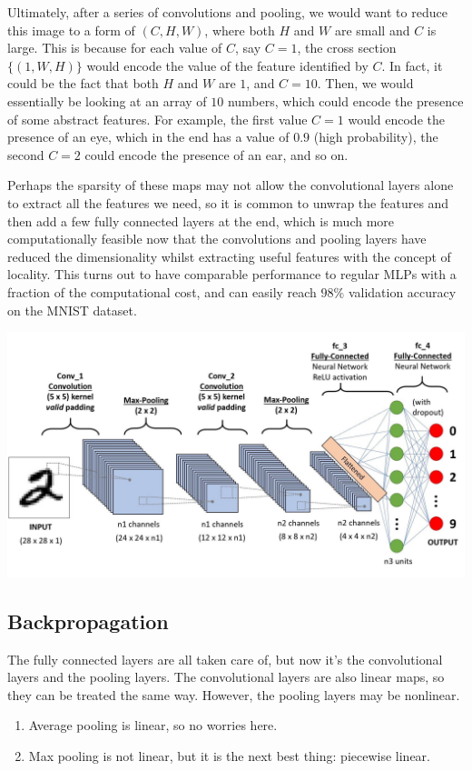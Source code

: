   Ultimately, after a series of convolutions and pooling, we would want to reduce this image to a form of $(C, H, W)$, where both $H$ and $W$ are small and $C$ is large. This is because for each value of $C$, say $C = 1$, the cross section $\{(1, W, H)\}$ would encode the value of the feature identified by $C$. In fact, it could be the fact that both $H$ and $W$ are $1$, and $C = 10$. Then, we would essentially be looking at an array of $10$ numbers, which could encode the presence of some abstract features. For example, the first value $C = 1$ would encode the presence of an eye, which in the end has a value of $0.9$ (high probability), the second $C = 2$ could encode the presence of an ear, and so on. 

  Perhaps the sparsity of these maps may not allow the convolutional layers alone to extract all the features we need, so it is common to unwrap the features and then add a few fully connected layers at the end, which is much more computationally feasible now that the convolutions and pooling layers have reduced the dimensionality whilst extracting useful features with the concept of locality. This turns out to have comparable performance to regular MLPs with a fraction of the computational cost, and can easily reach $98\%$ validation accuracy on the MNIST dataset. 

  \begin{center}
    \includegraphics[scale=0.25]{img/03_CNN/CNN_architecture.jpeg}
  \end{center}

\subsection{Backpropagation}

  The fully connected layers are all taken care of, but now it's the convolutional layers and the pooling layers. The convolutional layers are also linear maps, so they can be treated the same way. However, the pooling layers may be nonlinear. 
  \begin{enumerate}
    \item Average pooling is linear, so no worries here. 
    \item Max pooling is not linear, but it is the next best thing: piecewise linear. 
  \end{enumerate}

